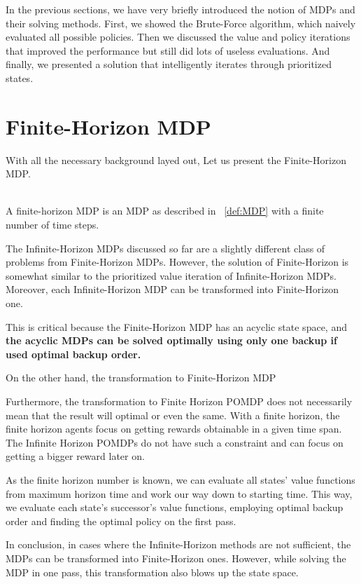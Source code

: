 In the previous sections, we have very briefly introduced the notion of MDPs and their solving methods. First, we showed the Brute-Force algorithm, which naively evaluated all possible policies. Then we discussed the value and policy iterations that improved the performance but still did lots of useless evaluations. And finally, we presented a solution that intelligently iterates through prioritized states. 

\section{Finite-Horizon MDP} \label{FHMDP}

With all the necessary background layed out, Let us present the Finite-Horizon MDP.\\ \\

\begin{definition}
A finite-horizon MDP is an MDP as described in ~\ref{def:MDP} with a finite number of time steps. %
\end{definition}


The Infinite-Horizon MDPs discussed so far are a slightly different class of problems from Finite-Horizon MDPs. However, the solution of Finite-Horizon is somewhat similar to the prioritized value iteration of Infinite-Horizon MDPs. 
Moreover, each Infinite-Horizon MDP can be transformed into Finite-Horizon one.

This is critical because the Finite-Horizon MDP has an acyclic state space, and \textbf{the acyclic MDPs can be solved optimally using only one backup if used optimal backup order.} \cite{Kolobov2012}

 On the other hand, the transformation to Finite-Horizon MDP %

Furthermore, the transformation to Finite Horizon POMDP does not necessarily mean that the result will optimal or even the same. With a finite horizon, the finite horizon agents focus on getting rewards obtainable in a given time span. The Infinite Horizon POMDPs do not have such a constraint and can focus on getting a bigger reward later on.

As the finite horizon number is known, we can evaluate all states' value functions from maximum horizon time and work our way down to starting time. This way, we evaluate each state's successor's value functions, employing optimal backup order and finding the optimal policy on the first pass.

In conclusion, in cases where the Infinite-Horizon methods are not sufficient, the MDPs can be transformed into Finite-Horizon ones. However, while solving the MDP in one pass, this transformation also blows up the state space.

